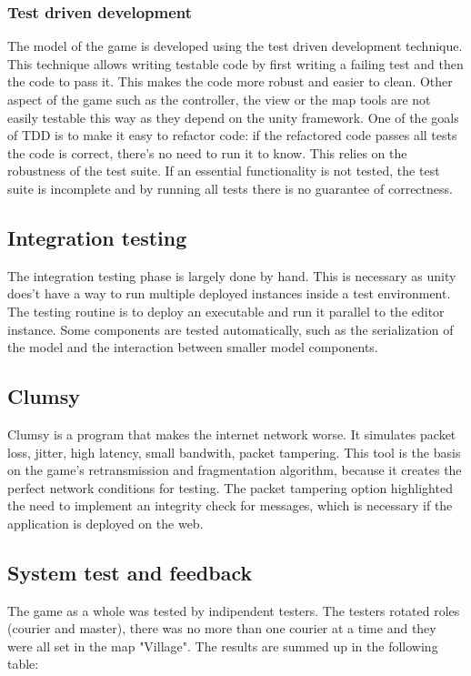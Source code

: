 \documentclass[12pt]{article}
\begin{document}
\subsubsection {Test driven development \cite{tdd}} 
The model of the game is developed using the test driven development technique. This technique allows writing testable code by first writing a failing test and then the code to pass it. This makes the code more robust and easier to clean. Other aspect of the game such as the controller, the view or the map tools are not easily testable this way as they depend on the unity framework. One of the goals of TDD is to make it easy to refactor code: if the refactored code passes all tests the code is correct, there's no need to run it to know. This relies on the robustness of the test suite. If an essential functionality is not tested, the test suite is incomplete and by running all tests there is no guarantee of correctness.
\subsection{Integration testing}
The integration testing phase is largely done by hand. This is necessary as unity does't have a way to run multiple deployed instances inside a test environment. The testing routine is to deploy an executable and run it parallel to the editor instance. Some components are tested automatically, such as the serialization of the model and the interaction between smaller model components.
\subsection{Clumsy \cite{clumsy}}
Clumsy is a program that makes the internet network worse. It simulates packet loss, jitter, high latency, small bandwith, packet tampering. This tool is the basis on the game's retransmission and fragmentation algorithm, because it creates the perfect network conditions for testing. The packet tampering option highlighted the need to implement an integrity check for messages, which is necessary if the application is deployed on the web.

\subsection{System test and feedback}
The game as a whole was tested by indipendent testers. The testers rotated roles (courier and master), there was no more than one courier at a time and they were all set in the map "Village". The results are summed up in the following table:
\end{document}
